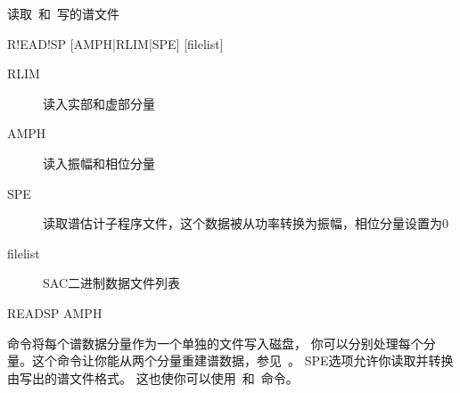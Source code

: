 \label{cmd:readsp}

读取~和~写的谱文件

\begin{SACSTX}
R!EAD!SP [AMPH|RLIM|SPE] [filelist]
\end{SACSTX}

\begin{description}
\item [RLIM]  读入实部和虚部分量
\item [AMPH]  读入振幅和相位分量
\item [SPE] 读取谱估计子程序文件，这个数据被从功率转换为振幅，相位分量设置为0
\item [filelist] SAC二进制数据文件列表
\end{description}

\begin{SACDFT}
READSP AMPH
\end{SACDFT}

命令将每个谱数据分量作为一个单独的文件写入磁盘，
你可以分别处理每个分量。这个命令让你能从两个分量重建谱数据，参见~。
SPE选项允许你读取并转换由写出的谱文件格式。
这也使你可以使用~和~命令。

